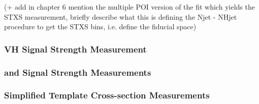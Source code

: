 (+ add in chapter 6 mention the multiple POI version of the fit which yields the
STXS measurement, briefly describe what this is defining the Njet - NHjet
procedure to get the STXS bins, i.e. define the fiducial space)



\subsubsection{VH Signal Strength Measurement}






\subsubsection{\WH and \ZH Signal Strength Measurements}



\clearpage
\newpage

\subsubsection{Simplified Template Cross-section Measurements}




